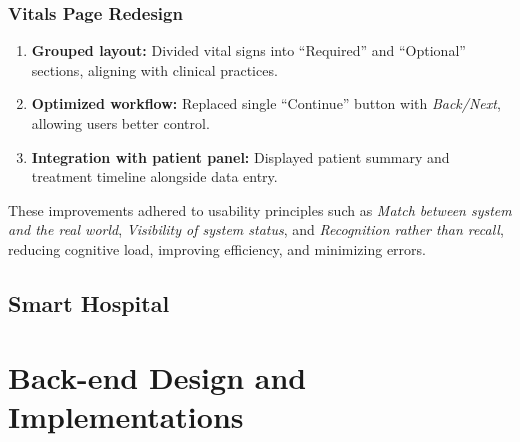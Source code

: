 \subsubsection{Vitals Page Redesign}
\begin{enumerate}
    \item \textbf{Grouped layout:} Divided vital signs into ``Required'' and ``Optional'' sections,
    aligning with clinical practices.
    \item \textbf{Optimized workflow:} Replaced single ``Continue'' button with \emph{Back/Next},
    allowing users better control.
    \item \textbf{Integration with patient panel:} Displayed patient summary and treatment timeline
    alongside data entry.
\end{enumerate}

These improvements adhered to usability principles such as
\emph{Match between system and the real world},
\emph{Visibility of system status}, and
\emph{Recognition rather than recall},
reducing cognitive load, improving efficiency, and minimizing errors.



\subsection{Smart Hospital}
\label{subsec:subsec02}

\section{Back-end Design and Implementations}
\label{sec:sec03}
